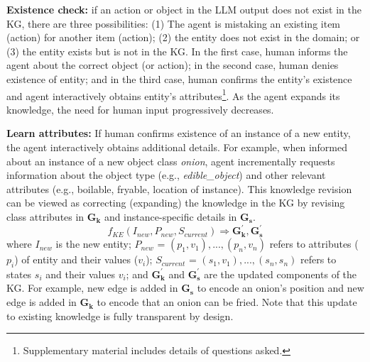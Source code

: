\vspace{-0.75em}
\noindent
\textbf{Existence check:} if an action or object in the LLM output does not exist in the KG, there are three possibilities: (1) The agent is mistaking an existing item (action) for another item (action); (2) the entity does not exist in the domain; or (3) the entity exists but is not in the KG. In the first case, human informs the agent about the correct object (or action); in the second case, human denies existence of entity; and in the third case, human confirms the entity's existence and agent interactively obtains entity's attributes\footnote{Supplementary material includes details of questions asked.}. As the agent expands its knowledge, the need for human input progressively decreases.

\vspace{-0.75em}
\noindent
\textbf{Learn attributes:} If human confirms existence of an instance of a new entity, the agent interactively obtains additional details. For example, when informed about an instance of a new object class \textit{onion}, agent incrementally requests information about the object type (e.g., \textit{edible\_object}) and other relevant attributes (e.g., boilable, fryable, location of instance). This knowledge revision can be viewed as correcting (expanding) the knowledge in the KG by revising class attributes in $\mathbf{G_k}$ and instance-specific details in $\mathbf{G_s}$.
$$f_{KE}(I_{new}, P_{new}, S_{current}) \Rightarrow {\mathbf{G_{k}^{'}}, \mathbf{G_{s}^{'}}}$$
where $I_{new}$ is the new entity; $P_{new}$ = ${(p_1, v_1), ..., (p_n, v_n)}$ refers to attributes ($p_i$) of entity and their values ($v_i$); $S_{current}$ = ${(s_1, v_1), ..., (s_n, s_n)}$ refers to states $s_i$ and their values $v_i$; and $\mathbf{G^{'}_{k}}$ and $\mathbf{G^{'}_{s}}$ are the updated components of the KG.  For example, new edge is added in $\mathbf{G_s}$ to encode an onion's position and new edge is added in $\mathbf{G_k}$ to encode that an onion can be fried. Note that this update to existing knowledge is fully transparent by design.

